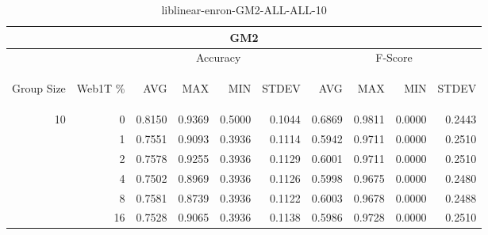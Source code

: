 \begin{center}
\begin{table}[htbp] 
 \begin{center}
\begin{tabular}{ | r | r | r | r | r | r | r | r | r | r |}
\hline
\multicolumn{10}{|c|}{GM2}\\
\hline
 & & \multicolumn{4}{|c|}{Accuracy} & \multicolumn{4}{|c|}{F-Score}\\ \cline{3-10}
\begin{sideways}Group Size\end{sideways} & \begin{sideways}Web1T \%\end{sideways} & \begin{sideways}AVG\end{sideways} & \begin{sideways}MAX\end{sideways} & \begin{sideways}MIN\end{sideways} & \begin{sideways}STDEV\end{sideways} & \begin{sideways}AVG\end{sideways} & \begin{sideways}MAX\end{sideways} & \begin{sideways}MIN\end{sideways} & \begin{sideways}STDEV\end{sideways}\\
\hline
\multirow{5}{*}{10}
 & 0 & 0.8150 & 0.9369 & 0.5000 & 0.1044 & 0.6869 & 0.9811 & 0.0000 & 0.2443\\ \cline{2-10}
 & 1 & 0.7551 & 0.9093 & 0.3936 & 0.1114 & 0.5942 & 0.9711 & 0.0000 & 0.2510\\ \cline{2-10}
 & 2 & 0.7578 & 0.9255 & 0.3936 & 0.1129 & 0.6001 & 0.9711 & 0.0000 & 0.2510\\ \cline{2-10}
 & 4 & 0.7502 & 0.8969 & 0.3936 & 0.1126 & 0.5998 & 0.9675 & 0.0000 & 0.2480\\ \cline{2-10}
 & 8 & 0.7581 & 0.8739 & 0.3936 & 0.1122 & 0.6003 & 0.9678 & 0.0000 & 0.2488\\ \cline{2-10}
 & 16 & 0.7528 & 0.9065 & 0.3936 & 0.1138 & 0.5986 & 0.9728 & 0.0000 & 0.2510\\ \cline{2-10}
\hline
\end{tabular}
\caption{liblinear-enron-GM2-ALL-ALL-10}
\label{table:liblinear-enron-GM2-ALL-ALL-10}
\end{center}
 \end{table}
\end{center}

